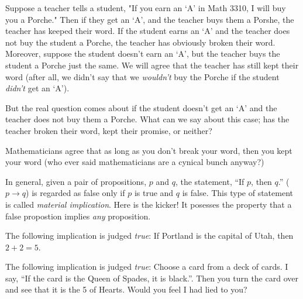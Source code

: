 \begin{example}
Suppose a teacher tells a student, "If you earn an `A' in Math 3310, I will buy you a Porche."  Then if they get an `A', and the teacher buys them a Porshe, the teacher has keeped their word.  If the student earns an `A' and the teacher does not buy the student a Porche, the teacher has obviously broken their word.  Moreover, suppose the student doesn't earn an `A', but the teacher buys the student a Porche just the same.  We will agree that the teacher has still kept their word (after all, we didn't say that we \emph{wouldn't} buy the Porche if the student \emph{didn't} get an `A').  

But the real question comes about if the student doesn't get an `A' and the teacher does not buy them a Porche.  What can we say about this case; has the teacher broken their word, kept their promise, or neither?

\vspace{1em}

\end{example}

Mathematicians agree that as long as you don't break your word, then you kept your word (who ever said mathematicians are a cynical bunch anyway?)


In general, given a pair of propositions, $p$ and $q$, the statement, ``If $p$, then $q$.'' ($p\rightarrow q$) is regarded as false only if $p$ is true and $q$ is false.  This type of statement is called \emph{material implication}.  Here is the kicker!  It posesses the property that a false propostion  implies \emph{any} proposition.

\begin{example}  The following implication is judged \emph{true}:  If Portland is the capital of Utah, then $2+2 = 5$.
\end{example}

\begin{example}  The following implication is judged \emph{true}:  Choose a card from a deck of cards.  I say, ``If the card is the Queen of Spades, it is black.''.  Then you turn the card over and see that it is the 5 of  Hearts.  Would you feel I had lied to you?
\end{example}

